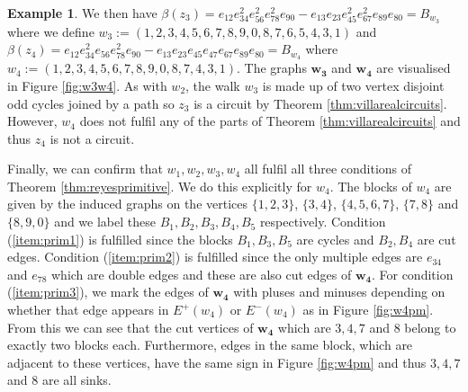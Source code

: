 \documentclass[a4paper, 12pt]{article}
\theoremstyle{plain}
\theoremstyle{definition}
\newtheorem{example}[theorem]{Example}
\theoremstyle{remark}
\begin{document}
\begin{example}
We then have $\beta(z_3)=e_{12}e_{34}^2e_{56}^2e_{78}^2e_{90}-e_{13}e_{23}e_{45}^2e_{67}^2e_{89}e_{80}=B_{w_3}$ 
where we define $w_3:=(1,2,3,4,5,6,7,8,9,0,8,7,6,5,4,3,1)$ and $\beta(z_4)=e_{12}e_{34}^2e_{56}e_{78}^2e_{90}-e_{13}e_{23}e_{45}e_{47}e_{67}e_{89}e_{80}=B_{w_4}$ 
where $w_4:=(1,2,3,4,5,6,7,8,9,0,8,7,4,3,1)$. The graphs $\mathbf{w_3}$ and $\mathbf{w_4}$ are visualised in Figure \ref{fig:w3w4}. As with $w_2$, the walk $w_3$ is made up of two vertex disjoint odd cycles joined by a path so $z_3$ is a circuit by Theorem \ref{thm:villarealcircuits}. However, $w_4$ does not fulfil any of the parts of Theorem \ref{thm:villarealcircuits} and thus $z_4$ is not a circuit.

Finally, we can confirm that $w_1,w_2,w_3,w_4$ all fulfil all three conditions of Theorem \ref{thm:reyesprimitive}. We do this explicitly for $w_4$. The blocks of $w_4$ are given by the induced graphs on the vertices $\{1,2,3\}$, $\{3,4\}$, $\{4,5,6,7\}$, $\{7,8\}$ and $\{8,9,0\}$ and we label these $B_1,B_2,B_3,B_4,B_5$ respectively. Condition (\ref{item:prim1}) is fulfilled since the blocks $B_1,B_3,B_5$ are cycles and $B_2,B_4$ are cut edges. Condition (\ref{item:prim2}) is fulfilled since the only multiple edges are $e_{34}$ and $e_{78}$ which are double edges and these are also cut edges of $\mathbf{w_4}$. For condition (\ref{item:prim3}), we mark the edges of $\mathbf{w_4}$ with pluses and minuses depending on whether that edge appears in $E^+(w_4)$ or $E^-(w_4)$ as in Figure \ref{fig:w4pm}. From this we can see that the cut vertices of $\mathbf{w_4}$ which are $3,4,7$ and $8$ belong to exactly two blocks each. Furthermore, edges in the same block, which are adjacent to these vertices, have the same sign in Figure \ref{fig:w4pm} and thus $3,4,7$ and $8$ are all sinks.



\end{example}
\end{document}
